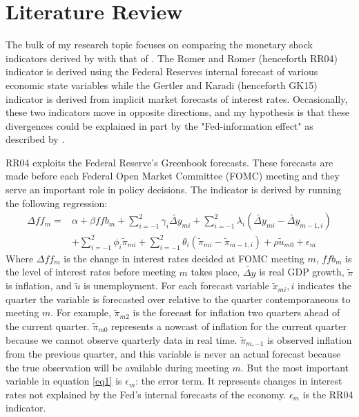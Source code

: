 \documentclass[a4paper,man,floatsintext,natbib]{apa6}
\begin{document}
	\section{Literature Review}
	The bulk of my research topic focuses on comparing the monetary shock indicators derived by \cite{Romer2004} with that of \cite{Gertler2015}. The Romer and Romer (henceforth RR04) indicator is derived using the Federal Reserves internal forecast of various economic state variables while the Gertler and Karadi (henceforth GK15) indicator is derived from implicit market forecasts of interest rates. Occasionally, these two indicators move in opposite directions, and my hypothesis is that these divergences could be explained in part by the "Fed-information effect" as described by \cite{Bauer2020}.
	
	RR04 exploits the Federal Reserve's Greenbook forecasts. These forecasts are made before each Federal Open Market Committee (FOMC) meeting and they serve an important role in policy decisions. The indicator is derived by running the following regression: 
	\begin{align*}
		\Delta ff_m = &\alpha + \beta ffb_m + \sum_{i=-1}^{2} \gamma_i \widetilde{\Delta y}_{mi} + \sum^2_{i=-1} \lambda_i \left(\widetilde{\Delta y}_{mi}-\widetilde{\Delta y}_{m-1,i}\right) \tag{1} \label{eq1}\\
		&+\sum^{2}_{i=-1} \phi_i \tilde{\pi}_{mi} + \sum^2_{i=-1} \theta_i \left(\tilde{ \pi}_{mi}-\tilde{ \pi}_{m-1,i}\right) + \rho \tilde{u}_{m0} + \epsilon_m
	\end{align*}
	Where \(\Delta ff_m\) is the change in interest rates decided at FOMC meeting \(m\), \(ffb_m\) is the level of interest rates before meeting \(m\) takes place, \(\widetilde{\Delta y}\) is real GDP growth, \(\tilde{\pi}\) is inflation, and \(\tilde{u}\) is unemployment. For each forecast variable \(\tilde{x}_{mi}, i\) indicates the quarter the variable is forecasted over relative to the quarter contemporaneous to meeting \(m\). For example, \(\tilde{\pi}_{m2}\) is the forecast for inflation two quarters ahead of the current quarter. \(\tilde{\pi}_{m0}\) represents a nowcast of inflation for the current quarter because we cannot observe quarterly data in real time. \(\tilde{\pi}_{m,-1}\) is observed inflation from the previous quarter, and this variable is never an actual forecast because the true observation will be available during meeting \(m\). But the most important variable in equation \ref{eq1} is \(\epsilon_m\):  the error term. It represents changes in interest rates not explained by the Fed's internal forecasts of the economy. \(\epsilon_m\) is the RR04 indicator. 
\end{document}
